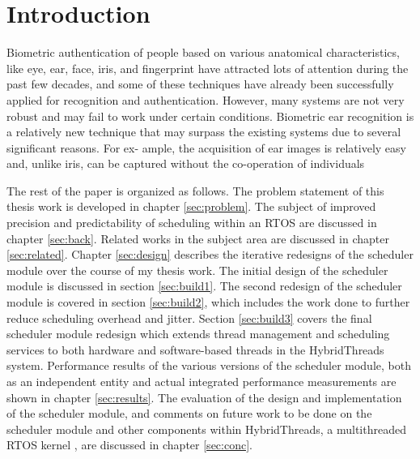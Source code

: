 \chapter{Introduction} \label{sec:intro} Biometric authentication of people based on various anatomical characteristics, like eye, ear, face, iris, and fingerprint have attracted lots of attention during the past few decades, and some of these techniques have already been successfully applied for recognition and authentication. However, many systems are not very robust and may fail to work under certain conditions. Biometric ear recognition is a relatively new technique that may surpass the existing systems due to several significant reasons. For ex- ample, the acquisition of ear images is relatively easy and, unlike iris, can be captured without the co-operation of individuals 


The rest of the paper is organized as follows.  The problem statement of this
thesis work is developed in chapter \ref{sec:problem}.  The subject of improved
precision and predictability of scheduling within an RTOS are discussed in
chapter \ref{sec:back}.  Related works in the subject area are discussed in
chapter \ref{sec:related}.  Chapter \ref{sec:design} describes the iterative
redesigns of the scheduler module over the course of my thesis work.  The
initial design of the scheduler module \cite{Agron:rt} is discussed in section
\ref{sec:build1}.  The second redesign of the scheduler module is covered in
section \ref{sec:build2}, which includes the work done to further reduce
scheduling overhead and jitter.  Section \ref{sec:build3} covers the final
scheduler module redesign which extends thread management and scheduling
services to both hardware and software-based threads in the HybridThreads
system.  Performance results of the various versions of the scheduler module,
both as an independent entity and actual integrated performance measurements
are shown in chapter \ref{sec:results}.  The evaluation of the design and
implementation of the scheduler module, and comments on future work to be done
on the scheduler module and other components within HybridThreads, a
multithreaded RTOS kernel
\cite{andrews04a,andrews04b,niehaus03,etfa05,Peck:dq}, are discussed in chapter
\ref{sec:conc}.

